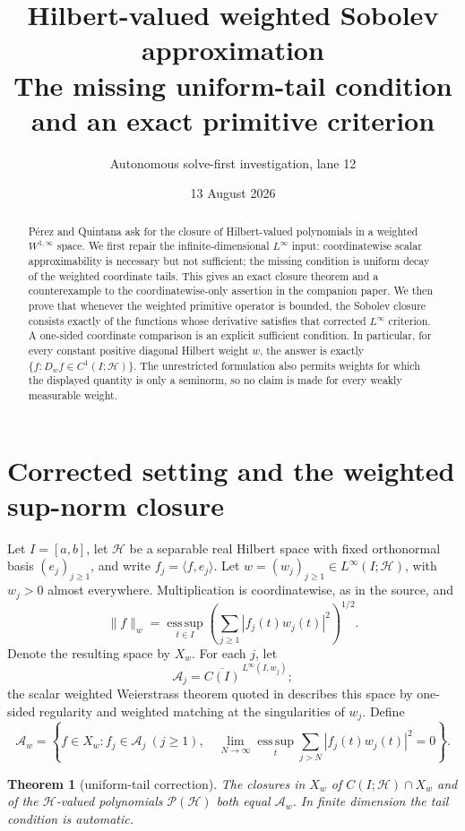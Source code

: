 \documentclass[11pt]{article}
\title{Hilbert-valued weighted Sobolev approximation\\
\large The missing uniform-tail condition and an exact primitive criterion}
\author{Autonomous solve-first investigation, lane 12}
\date{13 August 2026}
\newtheorem{theorem}{Theorem}
\newcommand{\Hh}{\mathcal H}
\newcommand{\Pw}{\mathcal P(\Hh)}
\newcommand{\Aw}{\mathcal A_w}
\newcommand{\esssup}{\operatorname*{ess\,sup}}
\begin{document}
\maketitle

\begin{abstract}
Pérez and Quintana ask for the closure of Hilbert-valued polynomials in a
weighted $W^{1,\infty}$ space.  We first repair the infinite-dimensional
$L^\infty$ input: coordinatewise scalar approximability is necessary but not
sufficient; the missing condition is uniform decay of the weighted
coordinate tails.  This gives an exact closure theorem and a counterexample
to the coordinatewise-only assertion in the companion paper.  We then prove
that whenever the weighted primitive operator is bounded, the Sobolev
closure consists exactly of the functions whose derivative satisfies that
corrected $L^\infty$ criterion.  A one-sided coordinate comparison is an
explicit sufficient condition.  In particular, for every constant positive
diagonal Hilbert weight $w$, the answer is exactly
$\{f:D_wf\in C^1(I;\Hh)\}$.  The unrestricted formulation also permits
weights for which the displayed quantity is only a seminorm, so no claim is
made for every weakly measurable weight.
\end{abstract}

\section{Corrected setting and the weighted sup-norm closure}

Let $I=[a,b]$, let $\Hh$ be a separable real Hilbert space with fixed
orthonormal basis $(e_j)_{j\ge1}$, and write $f_j=\langle f,e_j\rangle$.
Let $w=(w_j)_{j\ge1}\in L^\infty(I;\Hh)$, with $w_j>0$ almost everywhere.
Multiplication is coordinatewise, as in the source, and
\[
 \|f\|_w=\esssup_{t\in I}
 \left(\sum_{j\ge1}|f_j(t)w_j(t)|^2\right)^{1/2}.
\]
Denote the resulting space by $X_w$.  For each $j$, let
\[
 \mathcal A_j=\overline{C(I)}^{\,L^\infty(I,w_j)};
\]
the scalar weighted Weierstrass theorem quoted in \cite{PQ} describes this
space by one-sided regularity and weighted matching at the singularities of
$w_j$.  Define
\begin{equation}\label{eq:Aw}
 \Aw=\left\{f\in X_w: f_j\in\mathcal A_j\ (j\ge1),\quad
 \lim_{N\to\infty}\esssup_t
 \sum_{j>N}|f_j(t)w_j(t)|^2=0\right\}.
\end{equation}

\begin{theorem}[uniform-tail correction]\label{thm:Linf}
The closures in $X_w$ of $C(I;\Hh)\cap X_w$ and of the
$\Hh$-valued polynomials $\Pw$ both equal $\Aw$.
In finite dimension the tail condition is automatic.
\end{theorem}
\end{document}
